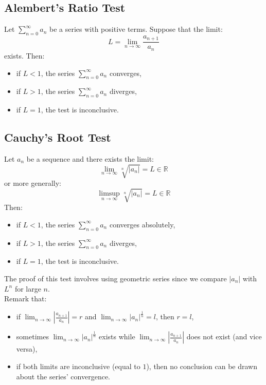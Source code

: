 \subsection{Alembert's Ratio Test}
\begin{theorem}
    Let $\sum_{n=0}^{\infty} a_n$ be a series with positive terms. Suppose that the limit:
    \[
        L = \lim_{n \to \infty} \frac{a_{n+1}}{a_n}
    \]
    exists. Then:
    \begin{itemize}[itemsep=1pt,label=$\circ$]
        \item if $L < 1$, the series $\sum_{n=0}^{\infty} a_n$ converges,
        \item if $L > 1$, the series $\sum_{n=0}^{\infty} a_n$ diverges,
        \item if $L = 1$, the test is inconclusive.
    \end{itemize}
\end{theorem}

\subsection{Cauchy's Root Test}
\begin{theorem}
    Let $a_n$ be a sequence and there exists the limit:
    \[
        \lim_{n \to \infty} \sqrt[n]{|a_n|} = L \in \mathbb{R}
    \]
    or more generally:
    \[
        \limsup_{n \to \infty} \sqrt[n]{|a_n|} = L \in \mathbb{R}
    \]
    Then:
    \begin{itemize}[itemsep=1pt,label=$\circ$]
        \item if $L < 1$, the series $\sum_{n=0}^{\infty} a_n$ converges absolutely,
        \item if $L > 1$, the series $\sum_{n=0}^{\infty} a_n$ diverges,
        \item if $L = 1$, the test is inconclusive.
    \end{itemize}
\end{theorem}
The proof of this test involves using geometric series since we compare $|a_n|$ with $L^n$ for large $n$. \\
Remark that:
\begin{itemize}[itemsep=1pt,label=$\circ$]
    \item if $\lim_{n \to \infty} \left|\frac{a_{n+1}}{a_n}\right| = r$ and $\lim_{n \to \infty} \left|a_n\right|^{\frac{1}{n}} = l$, then $r = l$,
    \item sometimes $\lim_{n \to \infty} \left|a_n\right|^{\frac{1}{n}}$ exists while $\lim_{n \to \infty} \left|\frac{a_{n+1}}{a_n}\right|$ does not exist (and vice versa),
    \item if both limits are inconclusive (equal to $1$), then no conclusion can be drawn about the series' convergence.
\end{itemize}

